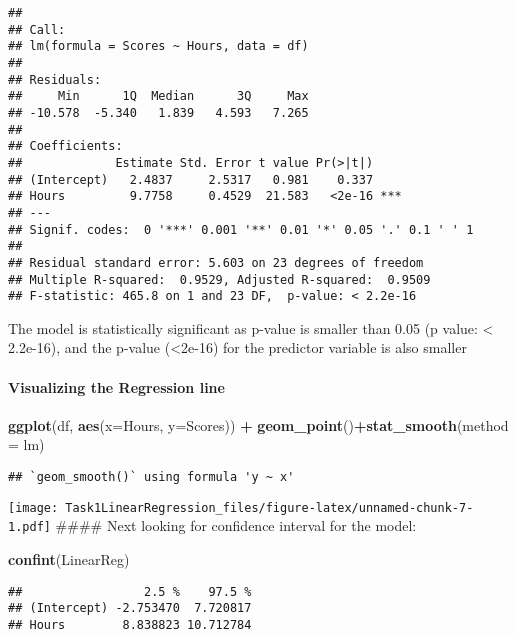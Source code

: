 \documentclass[
]{article}
\newenvironment{Shaded}{\begin{snugshade}}{\end{snugshade}}
\newcommand{\DataTypeTok}[1]{\textcolor[rgb]{0.13,0.29,0.53}{#1}}
\newcommand{\KeywordTok}[1]{\textcolor[rgb]{0.13,0.29,0.53}{\textbf{#1}}}
\newcommand{\NormalTok}[1]{#1}
\newcommand{\OperatorTok}[1]{\textcolor[rgb]{0.81,0.36,0.00}{\textbf{#1}}}
\newcommand{\StringTok}[1]{\textcolor[rgb]{0.31,0.60,0.02}{#1}}
\begin{document}
\begin{verbatim}
## 
## Call:
## lm(formula = Scores ~ Hours, data = df)
## 
## Residuals:
##     Min      1Q  Median      3Q     Max 
## -10.578  -5.340   1.839   4.593   7.265 
## 
## Coefficients:
##             Estimate Std. Error t value Pr(>|t|)    
## (Intercept)   2.4837     2.5317   0.981    0.337    
## Hours         9.7758     0.4529  21.583   <2e-16 ***
## ---
## Signif. codes:  0 '***' 0.001 '**' 0.01 '*' 0.05 '.' 0.1 ' ' 1
## 
## Residual standard error: 5.603 on 23 degrees of freedom
## Multiple R-squared:  0.9529, Adjusted R-squared:  0.9509 
## F-statistic: 465.8 on 1 and 23 DF,  p-value: < 2.2e-16
\end{verbatim}

The model is statistically significant as p-value is smaller than 0.05
(p value: \textless{} 2.2e-16), and the p-value (\textless2e-16) for the
predictor variable is also smaller

\hypertarget{visualizing-the-regression-line}{%
\paragraph{Visualizing the Regression
line}\label{visualizing-the-regression-line}}

\begin{Shaded}
\begin{Highlighting}[]
\KeywordTok{ggplot}\NormalTok{(df, }\KeywordTok{aes}\NormalTok{(}\DataTypeTok{x=}\NormalTok{Hours, }\DataTypeTok{y=}\NormalTok{Scores)) }\OperatorTok{+}\StringTok{ }
\StringTok{  }\KeywordTok{geom_point}\NormalTok{()}\OperatorTok{+}\KeywordTok{stat_smooth}\NormalTok{(}\DataTypeTok{method =}\NormalTok{ lm)}
\end{Highlighting}
\end{Shaded}

\begin{verbatim}
## `geom_smooth()` using formula 'y ~ x'
\end{verbatim}

\texttt{[image: Task1LinearRegression\_files/figure-latex/unnamed-chunk-7-1.pdf]}
\#\#\#\# Next looking for confidence interval for the model:

\begin{Shaded}
\begin{Highlighting}[]
\KeywordTok{confint}\NormalTok{(LinearReg)}
\end{Highlighting}
\end{Shaded}

\begin{verbatim}
##                 2.5 %    97.5 %
## (Intercept) -2.753470  7.720817
## Hours        8.838823 10.712784
\end{verbatim}
\end{document}
